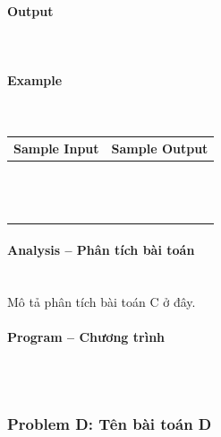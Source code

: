 \documentclass{article}
\begin{document}
\paragraph{Output}\mbox{} \\


\paragraph{Example}\mbox{} \\

\begin{table}[h]
    \centering
    \begin{tabular}{|l|r|}
        \hline
        \textbf{Sample Input} & \textbf{Sample Output} \\
        \hline
		&  \\ 
		&  \\ 
		&  \\ 
		&  \\ 
		&  \\
		&  \\ 
		&  \\ 
		&  \\ 
		&  \\ 
		&  \\ 
		&  \\ 
		&  \\
		&  \\ \hline
    \end{tabular}
\end{table}

\paragraph{Analysis -- Phân tích bài toán} \mbox{} \\

Mô tả phân tích bài toán C ở đây.

\paragraph{Program -- Chương trình} \mbox{} \\

\begin{lstlisting}

\end{lstlisting}

\subsubsection{Problem D: Tên bài toán D}
\end{document}
